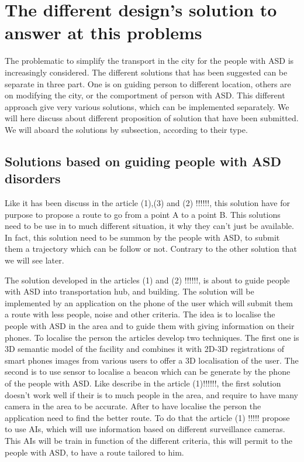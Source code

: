 \section{The different design's solution to answer at this problems}
The problematic to simplify the transport in the city for the people with ASD is increasingly considered. The different solutions that has been suggested can be separate in three part. One is on guiding person to different location, others are on modifying the city, or the comportment of person with ASD. This different approach give very various solutions, which can be implemented separately. We will here discuss about different proposition of solution that have been submitted. We will aboard the solutions by subsection, according to their type.

\subsection{Solutions based on guiding people with ASD disorders}
Like it has been discuss in the article (1),(3) and (2) !!!!!!, this solution have for purpose to propose a route to go from a point A to a point B. This solutions need to be use in to much different situation, it why they can't just be available. In fact, this solution need to be summon by the people with ASD, to submit them a trajectory which can be follow or not. Contrary to the other solution that we will see later.

The solution developed in the articles (1) and (2) !!!!!!, is about to guide people with ASD into transportation hub, and building. The solution will be implemented by an application on the phone of the user which will submit them a route with less people, noise and other criteria. The idea is to localise the people with ASD in the area and to guide them with giving information on their phones. To localise the person the articles develop two techniques. The first one is  3D semantic model of the facility and combines it with 2D-3D registrations of smart phones images from various users to offer a 3D localisation of the user. The second is to use sensor to localise a beacon which can be generate by the phone of the people with ASD. Like describe in the article (1)!!!!!!, the first solution doesn't work well if their is to much people in the area, and require to have many camera in the area to be accurate. After to have localise the person the application need to find the better route. To do that the article (1) !!!!! propose to use AIs, which will use information based on different surveillance cameras. This AIs will be train in function of the different criteria, this will permit to the people with ASD, to have a route tailored to him.

